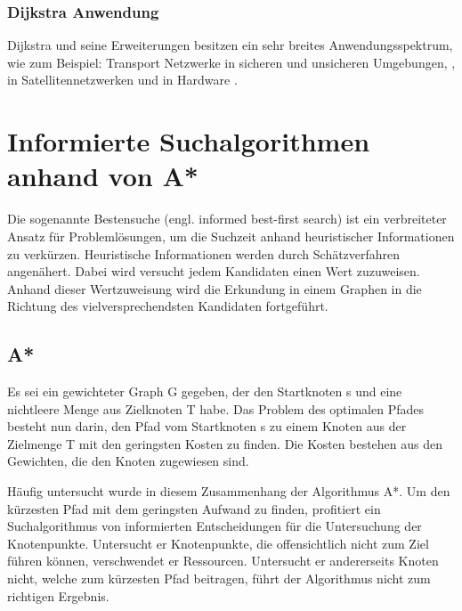 \subsubsection{Dijkstra Anwendung}

Dijkstra und seine Erweiterungen besitzen ein sehr breites Anwendungsspektrum, wie zum Beispiel: Transport Netzwerke in sicheren und unsicheren Umgebungen, \cite{fuzzyDijk} \cite{publicTrans}, in Satellitennetzwerken \cite{satelite} und in Hardware \cite{hardware}. 

\section{Informierte Suchalgorithmen anhand von A*}

Die sogenannte Bestensuche (engl. informed best-first search) ist ein verbreiteter Ansatz für Problemlösungen, um die Suchzeit anhand heuristischer Informationen zu verkürzen. Heuristische Informationen werden durch Schätzverfahren angenähert. Dabei wird versucht jedem Kandidaten einen Wert zuzuweisen. Anhand dieser Wertzuweisung wird die Erkundung in einem Graphen in die Richtung des vielversprechendsten Kandidaten fortgeführt.

\subsection{A*} 

Es sei ein gewichteter Graph G gegeben, der den Startknoten s und eine nichtleere Menge aus Zielknoten T habe. Das Problem des optimalen Pfades besteht nun darin, den Pfad vom Startknoten s zu einem Knoten aus der Zielmenge T mit den geringsten Kosten zu finden. Die Kosten bestehen aus den Gewichten, die den Knoten zugewiesen sind\cite{RinaDechterandJudeaPearl.1983}.

Häufig untersucht wurde in diesem Zusammenhang der Algorithmus A*. Um den kürzesten Pfad mit dem geringsten Aufwand zu finden, profitiert ein Suchalgorithmus von informierten Entscheidungen für die Untersuchung der Knotenpunkte. Untersucht er Knotenpunkte, die offensichtlich nicht zum Ziel führen können, verschwendet er Ressourcen. Untersucht er andererseits Knoten nicht, welche zum kürzesten Pfad beitragen, führt der Algorithmus nicht zum richtigen Ergebnis.

